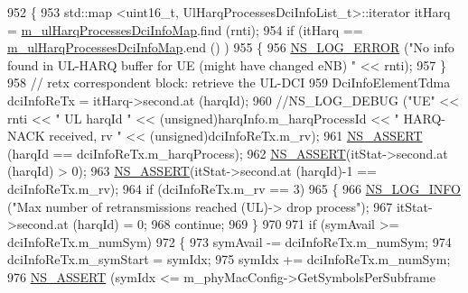 \begin{DoxyCode}
952                         \{
953                                 std::map <uint16\_t, UlHarqProcessesDciInfoList\_t>::iterator itHarq = 
      \hyperlink{classns3_1_1MmWaveFlexTtiMaxWeightMacScheduler_a637f826b85b2eeb88c80b53b468fdfcf}{m\_ulHarqProcessesDciInfoMap}.find (rnti);
954                                 \textcolor{keywordflow}{if} (itHarq == \hyperlink{classns3_1_1MmWaveFlexTtiMaxWeightMacScheduler_a637f826b85b2eeb88c80b53b468fdfcf}{m\_ulHarqProcessesDciInfoMap}.end ()
      )
955                                 \{
956                                         \hyperlink{group__logging_ga0261a8db1d4ac5f79417d117634fd455}{NS\_LOG\_ERROR} (\textcolor{stringliteral}{"No info found in UL-HARQ buffer for UE
       (might have changed eNB) "} << rnti);
957                                 \}
958                                 \textcolor{comment}{// retx correspondent block: retrieve the UL-DCI}
959                                 DciInfoElementTdma dciInfoReTx = itHarq->second.at (harqId);
960                                 \textcolor{comment}{//NS\_LOG\_DEBUG ("UE" << rnti << " UL harqId " <<
       (unsigned)harqInfo.m\_harqProcessId << " HARQ-NACK received, rv " << (unsigned)dciInfoReTx.m\_rv);}
961                                 \hyperlink{assert_8h_a6dccdb0de9b252f60088ce281c49d052}{NS\_ASSERT} (harqId == dciInfoReTx.m\_harqProcess);
962                                 \hyperlink{assert_8h_a6dccdb0de9b252f60088ce281c49d052}{NS\_ASSERT}(itStat->second.at (harqId) > 0);
963                                 \hyperlink{assert_8h_a6dccdb0de9b252f60088ce281c49d052}{NS\_ASSERT}(itStat->second.at (harqId)-1 == dciInfoReTx.m\_rv);
964                                 \textcolor{keywordflow}{if} (dciInfoReTx.m\_rv == 3)
965                                 \{
966                                         \hyperlink{group__logging_gafbd73ee2cf9f26b319f49086d8e860fb}{NS\_LOG\_INFO} (\textcolor{stringliteral}{"Max number of retransmissions reached
       (UL)-> drop process"});
967                                         itStat->second.at (harqId) = 0;
968                                         \textcolor{keywordflow}{continue};
969                                 \}
970 
971                                 \textcolor{keywordflow}{if} (symAvail >= dciInfoReTx.m\_numSym)
972                                 \{
973                                         symAvail -= dciInfoReTx.m\_numSym;
974                                         dciInfoReTx.m\_symStart = symIdx;
975                                         symIdx += dciInfoReTx.m\_numSym;
976                                         \hyperlink{assert_8h_a6dccdb0de9b252f60088ce281c49d052}{NS\_ASSERT} (symIdx <= m\_phyMacConfig->GetSymbolsPerSubframe

\end{DoxyCode}
